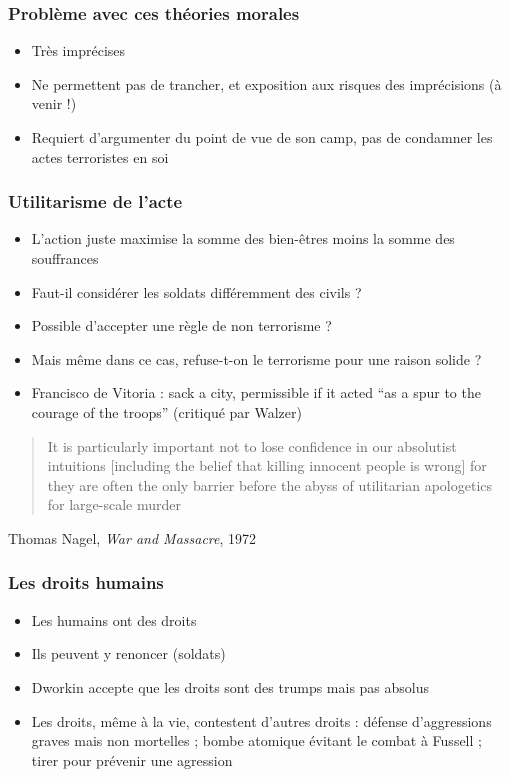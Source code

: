 \documentclass[english, french]{beamer}
\begin{document}
\begin{frame}
  \frametitle{Problème avec ces théories morales}
  \begin{itemize}
    \item Très imprécises
    \item Ne permettent pas de trancher, et exposition aux risques des imprécisions (à venir !)
    \item Requiert d’argumenter du point de vue de son camp, pas de condamner les actes terroristes en soi
  \end{itemize}
\end{frame}

\begin{frame}
  \frametitle{Utilitarisme de l’acte}
  \begin{itemize}
    \item L’action juste maximise la somme des bien-êtres moins la somme des souffrances
    \item Faut-il considérer les soldats différemment des civils ?
    \item Possible d’accepter une règle de non terrorisme ?
    \item Mais même dans ce cas, refuse-t-on le terrorisme pour une raison solide ?
    \item Francisco de Vitoria : sack a city, permissible if it acted “as a spur to the courage of the troops” (critiqué par Walzer)
  \end{itemize}
  \begin{quote}
    It is particularly important not to lose conﬁdence in our absolutist intuitions [including the belief that killing innocent people is wrong] for they are often the only barrier before the abyss of utilitarian apologetics for large-scale murder
  \end{quote}
  Thomas Nagel, \emph{War and Massacre}, 1972
\end{frame}

\begin{frame}
  \frametitle{Les droits humains}
  \begin{itemize}
    \item Les humains ont des droits
    \item Ils peuvent y renoncer (soldats)
    \item Dworkin accepte que les droits sont des trumps mais pas absolus
    \item Les droits, même à la vie, contestent d’autres droits : défense d’aggressions graves mais non mortelles ; bombe atomique évitant le combat à Fussell ; tirer pour prévenir une agression
  \end{itemize}
\end{frame}
\end{document}
